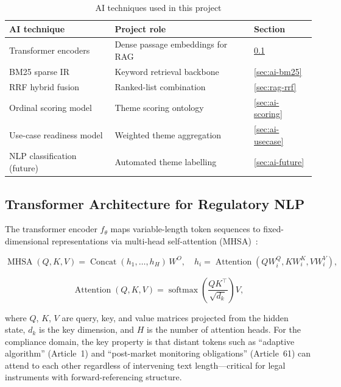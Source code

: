 \begin{table}[htbp]
\centering
\caption{AI techniques used in this project}
\label{tab:ai-layers}
\begin{tabular}{@{}p{3.4cm}p{4.0cm}p{3.8cm}@{}}
\toprule
\textbf{AI technique} & \textbf{Project role} & \textbf{Section} \\
\midrule
Transformer encoders & Dense passage embeddings for RAG & \ref{sec:ai-transformer} \\
BM25 sparse IR & Keyword retrieval backbone & \ref{sec:ai-bm25} \\
RRF hybrid fusion & Ranked-list combination & \ref{sec:rag-rrf} \\
Ordinal scoring model & Theme scoring ontology & \ref{sec:ai-scoring} \\
Use-case readiness model & Weighted theme aggregation & \ref{sec:ai-usecase} \\
NLP classification (future) & Automated theme labelling & \ref{sec:ai-future} \\
\bottomrule
\end{tabular}
\end{table}

\subsection{Transformer Architecture for Regulatory NLP}
\label{sec:ai-transformer}

The transformer encoder $f_\theta$ maps variable-length token sequences to
fixed-dimensional representations via multi-head self-attention
(MHSA)~\cite{vaswani2017}:

\begin{equation}
\label{eq:mhsa}
\operatorname{MHSA}(Q,K,V) = \operatorname{Concat}(h_1, \ldots, h_{H})\,W^O,
\quad h_i = \operatorname{Attention}(QW_i^Q, KW_i^K, VW_i^V),
\end{equation}

\begin{equation}
\label{eq:attn}
\operatorname{Attention}(Q,K,V) =
\operatorname{softmax}\!\left(\frac{QK^\top}{\sqrt{d_k}}\right)V,
\end{equation}

where $Q$, $K$, $V$ are query, key, and value matrices projected from the hidden
state, $d_k$ is the key dimension, and $H$ is the number of attention heads. For the
compliance domain, the key property is that distant tokens such as ``adaptive
algorithm'' (Article~1) and ``post-market monitoring obligations'' (Article~61) can
attend to each other regardless of intervening text length---critical for legal
instruments with forward-referencing structure.

